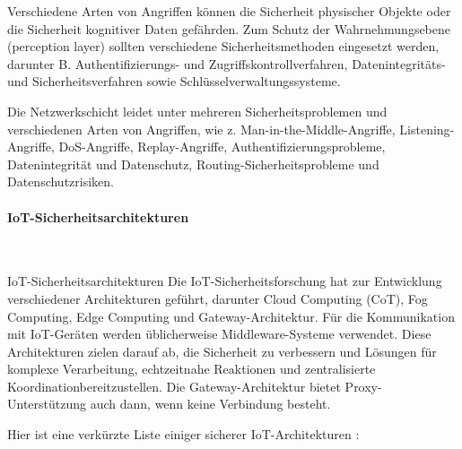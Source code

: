 Verschiedene Arten von Angriffen können die Sicherheit physischer Objekte oder die Sicherheit kognitiver Daten gefährden. Zum Schutz der Wahrnehmungsebene (perception layer)  sollten verschiedene Sicherheitsmethoden eingesetzt werden, darunter B. Authentifizierungs- und Zugriffskontrollverfahren, Datenintegritäts- und Sicherheitsverfahren sowie Schlüsselverwaltungssysteme\cite{saadeh2016authentication}.

 Die Netzwerkschicht leidet unter mehreren Sicherheitsproblemen und verschiedenen Arten von Angriffen, wie z. Man-in-the-Middle-Angriffe, Listening-Angriffe, DoS-Angriffe, Replay-Angriffe, Authentifizierungsprobleme, Datenintegrität und Datenschutz, Routing-Sicherheitsprobleme und Datenschutzrisiken\cite{saadeh2016authentication}\cite{khatoun2022cybersecurity}.


\paragraph{IoT-Sicherheitsarchitekturen}
\

IoT-Sicherheitsarchitekturen
Die IoT-Sicherheitsforschung hat zur Entwicklung verschiedener Architekturen geführt, darunter Cloud Computing (CoT), Fog Computing, Edge Computing und Gateway-Architektur. Für die Kommunikation mit IoT-Geräten werden üblicherweise Middleware-Systeme verwendet\cite{khatoun2022cybersecurity}. Diese Architekturen zielen darauf ab, die Sicherheit zu verbessern und Lösungen für komplexe Verarbeitung, echtzeitnahe Reaktionen und zentralisierte Koordinationbereitzustellen. Die Gateway-Architektur bietet Proxy-Unterstützung auch dann, wenn keine Verbindung besteht\cite{khatoun2022cybersecurity}.

Hier ist eine verkürzte Liste einiger sicherer IoT-Architekturen \cite{khatoun2022cybersecurity}:

